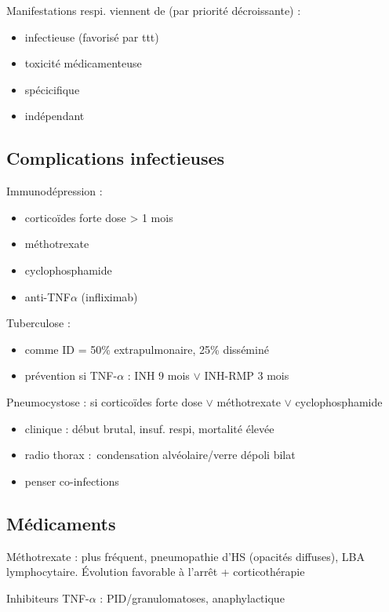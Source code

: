 \documentclass{article}
\begin{document}
Manifestations respi. viennent de (par priorité décroissante) :
\begin{itemize}
\item infectieuse (favorisé par ttt)
\item toxicité médicamenteuse
\item spécicifique
\item indépendant
\end{itemize}

\subsection{Complications infectieuses}
Immunodépression :
\begin{itemize}
\item corticoïdes forte dose > 1 mois
\item méthotrexate
\item cyclophosphamide
\item anti-TNF$\alpha$ (infliximab)
\end{itemize}
Tuberculose : 
\begin{itemize}
\item comme ID = 50\% extrapulmonaire, 25\% disséminé
\item prévention si TNF-$\alpha$ : INH 9 mois $\vee$ INH-RMP 3 mois
\end{itemize}
Pneumocystose : si corticoïdes forte dose $\vee$ méthotrexate $\vee$
cyclophosphamide
\begin{itemize}
\item clinique : début brutal, insuf. respi, mortalité élevée
\item radio thorax : condensation alvéolaire/verre dépoli bilat
\item penser co-infections
\end{itemize}
\subsection{Médicaments}
Méthotrexate : plus fréquent, pneumopathie d'HS (opacités diffuses), \gls{LBA}
lymphocytaire. Évolution favorable à l'arrêt + corticothérapie

Inhibiteurs TNF-$\alpha$ : PID/granulomatoses, anaphylactique
\end{document}
